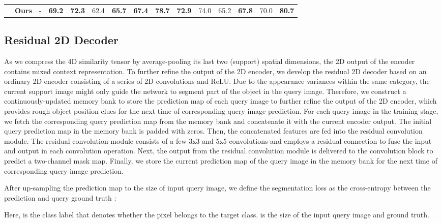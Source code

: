 \documentclass[journal]{IEEEtran}
\begin{document}
\begin{table*}[t]
\begin{center}
\begin{tabular}{c|lc|cccccc|cccccc}
         
                         \cline{2-15}
                          & \textbf{Ours}  & - & \textbf{69.2} & \textbf{72.3} & 62.4 & \textbf{65.7} & \textbf{67.4} & \textbf{78.7}   & \textbf{72.9} & 74.0 & 65.2  & \textbf{67.8} & 70.0 & \textbf{80.7}  \\ \cline{1-15}
\end{tabular}
\end{center}
\end{table*}

\subsection{Residual 2D Decoder}

As we compress the 4D similarity tensor by average-pooling its last two (support) spatial dimensions, the 2D output of the encoder contains mixed context representation. To further refine the output of the 2D encoder, we develop the residual 2D decoder based on an ordinary 2D encoder consisting of a series of 2D convolutions and ReLU. Due to the appearance variances within the same category, the current support image might only guide the network to segment part of the object in the query image. Therefore, we construct a continuously-updated memory bank to store the prediction map of each query image to further refine the output of the 2D encoder, which provides rough object position clues for the next time of corresponding query image prediction. For each query image in the training stage, we fetch the corresponding query prediction map from the memory bank and concatenate it with the current encoder output. The initial query prediction map in the memory bank is padded with zeros. Then, the concatenated features are fed into the residual convolution module. The residual convolution module consists of a few 3x3 and 5x5 convolutions and employs a residual connection to fuse the input and output in each convolution operation. Next, the output from the residual convolution module is delivered to the convolution block to predict a two-channel mask map. Finally, we store the current prediction map of the query image in the memory bank for the next time of corresponding query image prediction.

After up-sampling the prediction map to the size of input query image, we define the segmentation loss as the cross-entropy between the prediction  and query ground truth :
	
	Here,  is the class label that denotes whether the pixel belongs to the target class.  is the size of the input query image and ground truth. 
\end{document}
